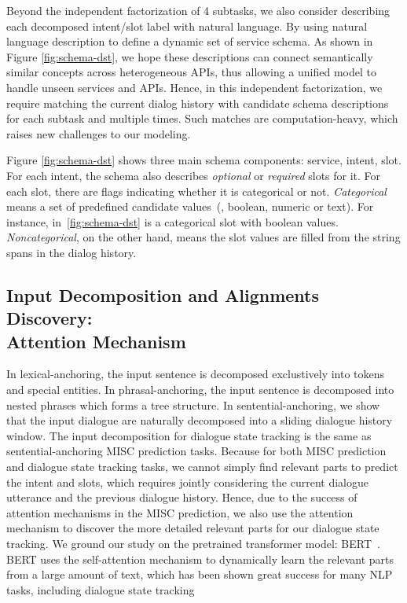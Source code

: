Beyond the independent factorization of 4 subtasks, we also consider
describing each decomposed intent/slot label with natural
language. By using natural language description to define a dynamic
set of service schema. As shown in Figure \ref{fig:schema-dst}, we
hope these descriptions can connect semantically similar concepts
across heterogeneous APIs, thus allowing a unified model to handle
unseen services and APIs. Hence, in this independent factorization, we
require matching the current dialog history with candidate schema
descriptions for each subtask and multiple times. Such matches are
computation-heavy, which raises new challenges to our modeling.

Figure \ref{fig:schema-dst} shows three
main schema components: service, intent, slot. For each intent, the
schema also describes {\it optional} or {\it required} slots for
it. For each slot, there are flags indicating whether it is
categorical or not. {\it Categorical} means a set of
predefined candidate values~(\ie, boolean, numeric or text). For instance,
 in~\autoref{fig:schema-dst} is a categorical
slot with boolean values. {\it Noncategorical}, on the other hand,
means the slot values are filled from the string spans in the dialog
history.

\subsection[Input Decomposition and Alignments Discovery: Attention]{Input Decomposition and Alignments Discovery: \\Attention Mechanism}
\label{sec:sgd:decompose-x}
In lexical-anchoring, the input sentence is decomposed exclustively
into tokens and special entities. In phrasal-anchoring, the input
sentence is decomposed into nested phrases which forms a tree
structure. In sentential-anchoring, we show that the input dialogue
are naturally decomposed into a sliding dialogue history window. The
input decomposition for dialogue state tracking is the same as
sentential-anchoring MISC prediction tasks. Because for both MISC
prediction and dialogue state tracking tasks, we cannot simply find
relevant parts to predict the intent and slots, which requires jointly
considering the current dialogue utterance and the previous dialogue
history. Hence, due to the success of attention mechanisms in the MISC
prediction, we also use the attention mechanism to discover the more
detailed relevant parts for our dialogue state tracking. We ground our
study on the pretrained transformer model:
BERT~\cite{devlin2018bert}. BERT uses the self-attention mechanism to
dynamically learn the relevant parts from a large amount of text,
which has been shown great success for many NLP tasks, including
dialogue state tracking~\cite{chao2019bert,noroozi2020fast}


